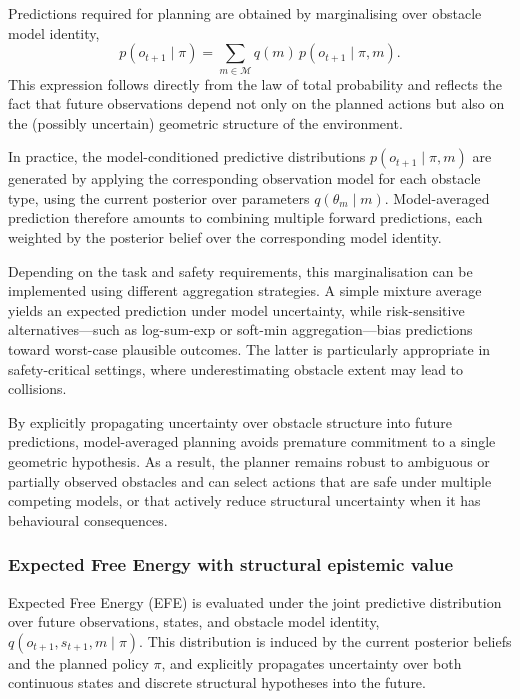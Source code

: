 \documentclass[a4paper, twoside]{article}
\begin{document}
Predictions required for planning are obtained by marginalising over obstacle model identity,
\begin{equation}
\label{eq:model_averaged_prediction}
p(o_{t+1} \mid \pi)
=
\sum_{m \in \mathcal{M}}
q(m)\,p(o_{t+1} \mid \pi, m).
\end{equation}
This expression follows directly from the law of total probability and reflects the fact
that future observations depend not only on the planned actions but also on the (possibly
uncertain) geometric structure of the environment.

In practice, the model-conditioned predictive distributions
$p(o_{t+1} \mid \pi, m)$ are generated by applying the corresponding observation model for
each obstacle type, using the current posterior over parameters $q(\theta_m \mid m)$.
Model-averaged prediction therefore amounts to combining multiple forward predictions,
each weighted by the posterior belief over the corresponding model identity.

Depending on the task and safety requirements, this marginalisation can be implemented
using different aggregation strategies.
A simple mixture average yields an expected prediction under model uncertainty, while
risk-sensitive alternatives—such as log-sum-exp or soft-min aggregation—bias predictions
toward worst-case plausible outcomes.
The latter is particularly appropriate in safety-critical settings, where underestimating
obstacle extent may lead to collisions.

By explicitly propagating uncertainty over obstacle structure into future predictions,
model-averaged planning avoids premature commitment to a single geometric hypothesis.
As a result, the planner remains robust to ambiguous or partially observed obstacles and
can select actions that are safe under multiple competing models, or that actively reduce
structural uncertainty when it has behavioural consequences.


\subsubsection{Expected Free Energy with structural epistemic value}
\label{sec:efe_structural_epistemic}

Expected Free Energy (EFE) is evaluated under the joint predictive distribution over future
observations, states, and obstacle model identity,
$q(o_{t+1}, s_{t+1}, m \mid \pi)$.
This distribution is induced by the current posterior beliefs and the planned policy $\pi$,
and explicitly propagates uncertainty over both continuous states and discrete structural
hypotheses into the future.
\end{document}
